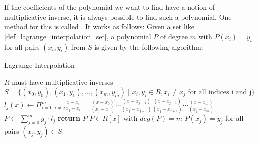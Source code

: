 If the coefficients of the polynomial we want to find have a notion of multiplicative inverse, it is always possible to find such a polynomial. One method for this is called . It works as follows:
Given a set like \ref{def_lagrange_interpolation_set}, a polynomial $P$ of degree $m$ with $P(x_i)=y_i$ for all pairs $(x_i,y_i)$ from $S$ is given by the following algorithm:

\begin{algorithm}\caption{Lagrange Interpolation}
\label{alg_lagrange_interplation}
\begin{algorithmic}[0]
\Require $R$ must have multiplicative inverses
\Require $S= \{(x_0,y_0), (x_1,y_1),\ldots,(x_m,y_m)\;|\; x_i,y_i\in R, x_i\neq x_j\text{ for all indices i and j}\}$  
\State  $l_j(x) \gets \Pi_{i=0;i\neq j}^{m}\frac{x-x_i}{x_j-x_i} = \frac{(x-x_0)}{(x_j-x_0)} \cdots \frac{(x-x_{j-1})}{(x_j-x_{j - 1})} \frac{(x-x_{j+1})}{(x_j-x_{j+1})} \cdots \frac{(x-x_m)}{(x_j-x_m)}$
\EndFor
\State $P\gets \sum_{j=0}^m y_j\cdot l_j$
\State \textbf{return} $P$ 
\EndProcedure
\Ensure $P\in R[x]$ with $deg(P)=m$
\Ensure $P(x_j)=y_j$ for all pairs $(x_j,y_j)\in S$
\end{algorithmic}
\end{algorithm}

